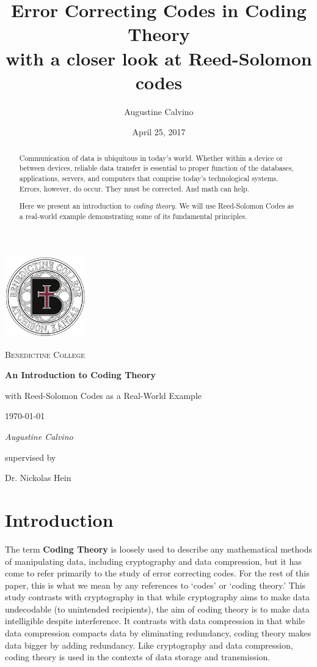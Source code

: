 \documentclass[11pt]{article}
\title{Error Correcting Codes in Coding Theory \\
\large{with a closer look at Reed-Solomon codes}}
\date{April 25, 2017}
\author{Augustine Calvino}
\begin{document}
\begin{titlepage}
	\centering
	\includegraphics[width=0.265\textwidth]{BC_logo.png}\par
	\vspace{1cm}
	{\scshape\LARGE Benedictine College \par}
	\vspace{1.5cm}
	{\huge\bfseries An Introduction to Coding Theory \par}
	{\LARGE with Reed-Solomon Codes as a Real-World Example \par}
	\vspace{1cm}
	{\large \today\par}
	\vspace{1.5cm}
	{\Large\itshape Augustine Calvino \par}
	\vspace{.5cm}
	supervised by\par
	Dr. Nickolas Hein
	\vspace{1.5cm}
	
	\thispagestyle{empty}
	\begin{abstract}
	Communication of data is ubiquitous in today's world. Whether within a device or between devices, reliable data transfer is essential to proper function of the databases, applications, servers, and computers that comprise today's technological systems. Errors, however, do occur. They must be corrected. And math can help.
	
	Here we present an introduction to \textit{coding theory}. We will use Reed-Solomon Codes as a real-world example demonstrating some of its fundamental principles. 
	\end{abstract}
	\vfill
\end{titlepage}
\clearpage

\section{Introduction}

The term \textbf{Coding Theory} is loosely used to describe any mathematical methods of manipulating data, including cryptography and data compression, but it has come to refer primarily to the study of error correcting codes. For the rest of this paper, this is what we mean by any references to `codes' or `coding theory.' This study contrasts with cryptography in that while cryptography aims to make data undecodable (to unintended recipients), the aim of coding theory is to make data intelligible despite interference. It contrasts with data compression in that while data compression compacts data by eliminating redundancy, coding theory makes data bigger by adding redundancy. \cite[1]{introtocoding} Like cryptography and data compression, coding theory is used in the contexts of data storage and transmission.
\end{document}
